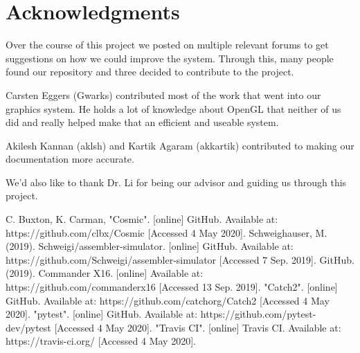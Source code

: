 \documentclass[conference]{IEEEtran}
\begin{document}
\section{Acknowledgments}
Over the course of this project we posted on multiple relevant forums to get suggestions on how we could improve the system. Through this, many people found our repository and three decided to contribute to the project.

Carsten Eggers (Gwarks) contributed most of the work that went into our graphics system. He holds a lot of knowledge about OpenGL that neither of us did and really helped make that an efficient and useable system.

Akilesh Kannan (aklsh) and Kartik Agaram (akkartik) contributed to making our documentation more accurate.

We'd also like to thank Dr. Li for being our advisor and guiding us through this project. 

\begin{thebibliography}{00}
 C. Buxton, K. Carman, "Cosmic". [online] GitHub. Available at: https://github.com/clbx/Cosmic [Accessed 4 May 2020].
 Schweighauser, M. (2019). Schweigi/assembler-simulator. [online] GitHub. Available at: https://github.com/Schweigi/assembler-simulator [Accessed 7 Sep. 2019].
 GitHub. (2019). Commander X16. [online] Available at: https://github.com/commanderx16 [Accessed 13 Sep. 2019].
 "Catch2". [online] GitHub. Available at: https://github.com/catchorg/Catch2 [Accessed 4 May 2020].
 "pytest". [online] GitHub. Available at: https://github.com/pytest-dev/pytest [Accessed 4 May 2020].
 "Travis CI". [online] Travis CI. Available at: https://travis-ci.org/ [Accessed 4 May 2020].
\end{thebibliography}
\end{document}
